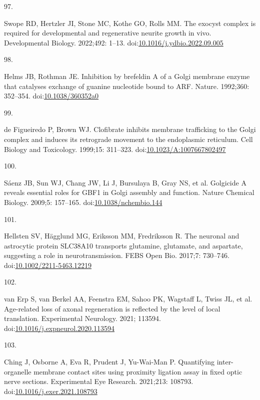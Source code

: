 \documentclass[
  12pt,
  a4paper,
]{book}
\newlength{\cslhangindent}
\newlength{\csllabelwidth}
\newlength{\cslentryspacingunit} %
\newenvironment{CSLReferences}[2] %
 {%
  \setlength{\parindent}{0pt}
  \ifodd #1
  \let\oldpar\par
  \def\par{\hangindent=\cslhangindent\oldpar}
  \fi
  \setlength{\parskip}{#2\cslentryspacingunit}
 }%
 {}
\newcommand{\CSLLeftMargin}[1]{\parbox[t]{\csllabelwidth}{#1}}
\newcommand{\CSLRightInline}[1]{\parbox[t]{\linewidth - \csllabelwidth}{#1}\break}
\begin{document}
\begin{CSLReferences}{0}{0}
\leavevmode{}%
\CSLLeftMargin{97. }%
\CSLRightInline{Swope RD, Hertzler JI, Stone MC, Kothe GO, Rolls MM. The exocyst complex is required for developmental and regenerative neurite growth in vivo. Developmental Biology. 2022;492: 1--13. doi:\href{https://doi.org/10.1016/j.ydbio.2022.09.005}{10.1016/j.ydbio.2022.09.005}}

\leavevmode{}%
\CSLLeftMargin{98. }%
\CSLRightInline{Helms JB, Rothman JE. Inhibition by brefeldin {A} of a {Golgi} membrane enzyme that catalyses exchange of guanine nucleotide bound to {ARF}. Nature. 1992;360: 352--354. doi:\href{https://doi.org/10.1038/360352a0}{10.1038/360352a0}}

\leavevmode{}%
\CSLLeftMargin{99. }%
\CSLRightInline{de Figueiredo P, Brown WJ. Clofibrate inhibits membrane trafficking to the {Golgi} complex and induces its retrograde movement to the endoplasmic reticulum. Cell Biology and Toxicology. 1999;15: 311--323. doi:\href{https://doi.org/10.1023/A:1007667802497}{10.1023/A:1007667802497}}

\leavevmode{}%
\CSLLeftMargin{100. }%
\CSLRightInline{Sáenz JB, Sun WJ, Chang JW, Li J, Bursulaya B, Gray NS, et al. Golgicide {A} reveals essential roles for {GBF1} in {Golgi} assembly and function. Nature Chemical Biology. 2009;5: 157--165. doi:\href{https://doi.org/10.1038/nchembio.144}{10.1038/nchembio.144}}

\leavevmode{}%
\CSLLeftMargin{101. }%
\CSLRightInline{Hellsten SV, Hägglund MG, Eriksson MM, Fredriksson R. The neuronal and astrocytic protein {SLC38A10} transports glutamine, glutamate, and aspartate, suggesting a role in neurotransmission. FEBS Open Bio. 2017;7: 730--746. doi:\href{https://doi.org/10.1002/2211-5463.12219}{10.1002/2211-5463.12219}}

\leavevmode{}%
\CSLLeftMargin{102. }%
\CSLRightInline{van Erp S, van Berkel AA, Feenstra EM, Sahoo PK, Wagstaff L, Twiss JL, et al. Age-related loss of axonal regeneration is reflected by the level of local translation. Experimental Neurology. 2021; 113594. doi:\href{https://doi.org/10.1016/j.expneurol.2020.113594}{10.1016/j.expneurol.2020.113594}}

\leavevmode{}%
\CSLLeftMargin{103. }%
\CSLRightInline{Ching J, Osborne A, Eva R, Prudent J, Yu-Wai-Man P. Quantifying inter-organelle membrane contact sites using proximity ligation assay in fixed optic nerve sections. Experimental Eye Research. 2021;213: 108793. doi:\href{https://doi.org/10.1016/j.exer.2021.108793}{10.1016/j.exer.2021.108793}}

\end{CSLReferences}
\end{document}
